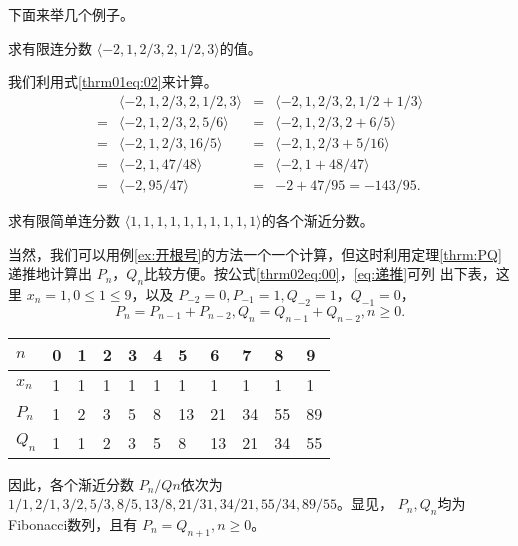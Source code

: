 下面来举几个例子。
\begin{example}
	求有限连分数 \( \langle -2, 1, 2/3, 2, 1/2, 3 \rangle \)的值。
\end{example}
\begin{solution}
	我们利用式\eqref{thrm01eq:02}来计算。
	\begin{align*}
		  & \langle -2, 1, 2/3, 2, 1/2, 3 \rangle & = & \langle -2, 1, 2/3, 2, 1/2 + 1/3 \rangle \\
		= & \langle -2, 1, 2/3, 2, 5/6 \rangle    & = & \langle -2, 1, 2/3, 2 + 6/5 \rangle      \\
		= & \langle -2, 1, 2/3, 16/5 \rangle      & = & \langle -2, 1, 2/3 + 5/16 \rangle        \\
		= & \langle -2, 1, 47/48 \rangle          & = & \langle -2, 1 + 48/47 \rangle            \\
		= & \langle -2, 95/47 \rangle             & = & -2 + 47/95 = -143/95.
	\end{align*}
\end{solution}

\begin{example}
	求有限简单连分数 \( \langle 1,1,1,1,1,1,1,1,1,1 \rangle \)的各个渐近分数。
\end{example}
\begin{solution}
	当然，我们可以用例\ref{ex:开根号}的方法一个一个计算，但这时利用定理\ref{thrm:PQ}递推地计算出 \( P_n，Q_n
	\)比较方便。按公式\eqref{thrm02eq:00}，\eqref{eq:递推}可列
	出下表，这里 \( x_n=1,0 \leqslant 1 \leqslant 9 \)，以及 \( P_{-2}=0,P_{-1}=1,Q_{-2}=1，Q_{-1} = 0 \)，
	\begin{equation*}
		P_n = P_{n-1} + P_{n-2}, Q_n = Q_{n-1} + Q_{n-2}, n \geqslant 0.
	\end{equation*}

	\begin{table}[htbp]
		\centering
		\begin{tabularx}{\textwidth}{XXXXXXXXXXX}\toprule
			\( n \)   & 0 & 1 & 2 & 3 & 4 & 5  & 6  & 7  & 8  & 9  \\ \midrule
			\( x_n \) & 1 & 1 & 1 & 1 & 1 & 1  & 1  & 1  & 1  & 1  \\
			\( P_n \) & 1 & 2 & 3 & 5 & 8 & 13 & 21 & 34 & 55 & 89 \\
			\( Q_n \) & 1 & 1 & 2 & 3 & 5 & 8  & 13 & 21 & 34 & 55 \\ \bottomrule
		\end{tabularx}
	\end{table}
	因此，各个渐近分数 \( P_n/Qn \)依次为 \( 1/1, 2/1, 3/2, 5/3, 8/5, 13/8, 21/31, 34/21, 55/34, 89/55 \)。显见， \( P_n, Q_n
	\)均为Fibonacci数列，且有 \( P_n = Q_{n+1}, n \geqslant 0 \)。
\end{solution}

